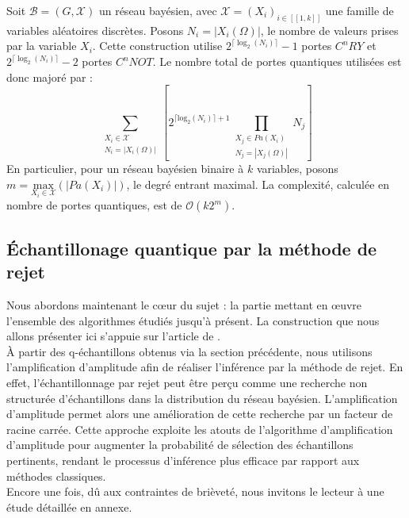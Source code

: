 \noindent
Soit $\mathcal{B} = (G, \mathcal{X})$ un réseau bayésien, avec $\mathcal{X} = (X_i)_{i \in [\![1,k]\!]}$ une famille de variables aléatoires discrètes. Posons $N_i = |X_i(\Omega)|$, le nombre de valeurs prises par la variable $X_i$. Cette construction utilise $2^{\lceil \log_2(N_i) \rceil} - 1$ portes $C^nRY$ et $2^{\lceil \log_2(N_i) \rceil} - 2$ portes $C^nNOT$. Le nombre total de portes quantiques utilisées est donc majoré par :
\[\sum_{\substack{X_i \in \mathcal{X} \\ N_i = |X_i(\Omega)|}}
\left[
2^{\lceil \mathrm{log}_2(N_i)\rceil+1} \prod_{\substack{X_j\in Pa(X_i) \\ N_j = |X_j(\Omega)|}}N_j 
\right] 
\]
En particulier, pour un réseau bayésien  binaire à $k$ variables, posons $m = \underset{X_i \in \mathcal{X}}{\mathrm{max}}(|Pa(X_i)|)$, le degré entrant maximal. La complexité, calculée en nombre de portes quantiques, est de $\mathcal{O}(k2^m)$.

\subsection{Échantillonage quantique par la méthode de rejet}

Nous abordons maintenant le cœur du sujet : la partie mettant en œuvre l'ensemble des algorithmes étudiés jusqu'à présent. La construction que nous allons présenter ici s'appuie sur l'article de \cite{low2014quantum}.
\\
À partir des q-échantillons obtenus via la section précédente, nous utilisons l'amplification d'amplitude afin de réaliser l'inférence par la méthode de rejet. En effet, l'échantillonnage par rejet peut être perçu comme une recherche non structurée d'échantillons dans la distribution du réseau bayésien. L'amplification d'amplitude permet alors une amélioration de cette recherche par un facteur de racine carrée. Cette approche exploite les atouts de l'algorithme d'amplification d'amplitude pour augmenter la probabilité de sélection des échantillons pertinents, rendant le processus d'inférence plus efficace par rapport aux méthodes classiques.
\\
Encore une fois, dû aux contraintes de brièveté, nous invitons le lecteur à une étude détaillée en annexe. %

